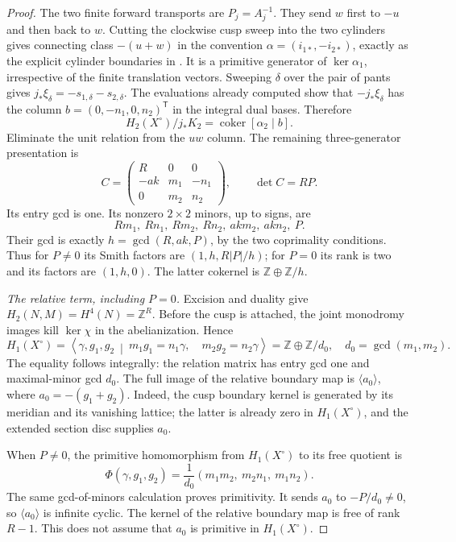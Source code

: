 \begin{proof}
The two finite forward transports are $P_j=A_j^{-1}$.
They send $w$ first to $-u$ and then back to $w$.
Cutting the clockwise cusp sweep into the two cylinders gives
connecting class $-(u+w)$ in the convention
$\alpha=(i_{1*},-i_{2*})$, exactly as the explicit cylinder
boundaries in \cite[Lemma 7.10, Appendix B.4]{manYang26}.
It is a primitive generator of $\ker\alpha_1$, irrespective
of the finite translation vectors. Sweeping $\delta$ over the
pair of pants gives
$j_*\xi_\delta=-s_{1,\delta}-s_{2,\delta}$.
The evaluations already computed show that $-j_*\xi_\delta$
has the column $b=(0,-n_1,0,n_2)^{\mathsf T}$ in the integral
dual bases. Therefore
\[
 H_2(X^\circ)/j_*K_2
    =\operatorname{coker}[\alpha_2\mid b].
\]
Eliminate the unit relation from the $uw$ column. The remaining
three-generator presentation is
\[
 C=\begin{pmatrix}
 R&0&0\\-ak&m_1&-n_1\\0&m_2&n_2
 \end{pmatrix},\qquad \det C=RP.
\]
Its entry gcd is one. Its nonzero $2\times2$ minors, up to signs,
are
\[
 Rm_1,\ Rn_1,\ Rm_2,\ Rn_2,\ akm_2,\ akn_2,\ P.
\]
Their gcd is exactly $h=\gcd(R,ak,P)$, by the two coprimality
conditions. Thus for $P\ne0$ its Smith factors are
$(1,h,R|P|/h)$; for $P=0$ its rank is two and its factors are
$(1,h,0)$. The latter cokernel is $\mathbb Z\oplus\mathbb Z/h$.

\emph{The relative term, including $P=0$.}
Excision and duality give $H_2(N,M)=H^4(N)=\mathbb Z^R$.
Before the cusp is attached, the joint monodromy images kill
$\ker\chi$ in the abelianization. Hence
\[
 H_1(X^\circ)=\left\langle\gamma,g_1,g_2\ \middle|\
 m_1g_1=n_1\gamma,\quad m_2g_2=n_2\gamma\right\rangle
       =\mathbb Z\oplus\mathbb Z/d_0,
 \quad d_0=\gcd(m_1,m_2).
\]
The equality follows integrally: the relation matrix has entry
gcd one and maximal-minor gcd $d_0$.
The full image of the relative boundary map is
$\langle a_0\rangle$, where $a_0=-(g_1+g_2)$.
Indeed, the cusp boundary kernel is generated by its meridian
and its vanishing lattice; the latter is already zero in
$H_1(X^\circ)$, and the extended section disc supplies $a_0$.

When $P\ne0$, the primitive homomorphism from $H_1(X^\circ)$
to its free quotient is
\[
 \Phi(\gamma,g_1,g_2)
 =\frac1{d_0}(m_1m_2,\ m_2n_1,\ m_1n_2).
\]
The same gcd-of-minors calculation proves primitivity.
It sends $a_0$ to $-P/d_0\ne0$, so $\langle a_0\rangle$
is infinite cyclic. The kernel of the relative boundary map
is free of rank $R-1$. This does not assume that $a_0$ is
primitive in $H_1(X^\circ)$.


\end{proof}

